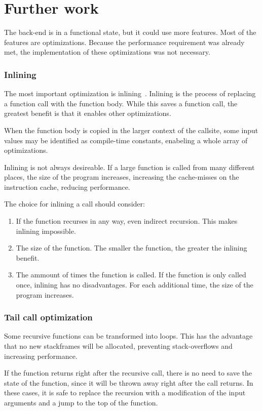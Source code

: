 \section{Further work}\label{recommendations}
The back-end is in a functional state, but it could use more features.
Most of the features are optimizations.
Because the performance requirement was already met, the implementation of these optimizations was not necessary.

\subsubsection{Inlining}
The most important optimization is inlining~\cite{inlining}.
Inlining is the process of replacing a function call with the function body.
While this saves a function call, the greatest benefit is that it enables other optimizations.

When the function body is copied in the larger context of the callsite, some input values may be identified as compile-time constants, enabeling a whole array of optimizations. 

Inlining is not always desireable.
If a large function is called from many different places, the size of the program increases, increasing the cache-misses on the instruction cache, reducing performance.

The choice for inlining a call should consider:
\begin{enumerate}
    \item If the function recurses in any way, even indirect recursion.
        This makes inlining impossible.
    \item The size of the function.
        The smaller the function, the greater the inlining benefit.
    \item The ammount of times the function is called.
        If the function is only called once, inlining has no disadvantages.
        For each additional time, the size of the program increases.
\end{enumerate}

\subsubsection{Tail call optimization}
Some recursive functions can be transformed into loops.
This has the advantage that no new stackframes will be allocated, preventing stack-overflows and increasing performance.

If the function returns right after the recursive call, there is no need to save the state of the function, since it will be thrown away right after the call returns.
In these cases, it is safe to replace the recursion with a modification of the input arguments and a jump to the top of the function.

